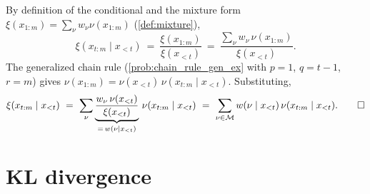 \documentclass[fontsize=11pt, parskip=half]{scrartcl}
\newcommand{\Mc}{\mathcal{M}}
\begin{document}
\begin{solution}
By definition of the conditional and the mixture form $\xi(x_{1:m}) = \sum_\nu w_\nu \nu(x_{1:m})$ (\cref{def:mixture}),
\[
  \xi(x_{t:m} \mid x_{<t})
  ~=~ \frac{\xi(x_{1:m})}{\xi(x_{<t})}
  ~=~ \frac{\sum_\nu w_\nu\, \nu(x_{1:m})}{\xi(x_{<t})}.
\]
The generalized chain rule (\cref{prob:chain_rule_gen_ex} with $p=1$, $q=t-1$, $r=m$) gives $\nu(x_{1:m}) = \nu(x_{<t})\,\nu(x_{t:m} \mid x_{<t})$. Substituting,
\[
  \xi(x_{t:m} \mid x_{<t})
  ~=~ \sum_\nu \underbrace{\frac{w_\nu\, \nu(x_{<t})}{\xi(x_{<t})}}_{=\, w(\nu \mid x_{<t})}\, \nu(x_{t:m} \mid x_{<t})
  ~=~ \sum_{\nu \in \Mc} w(\nu \mid x_{<t})\, \nu(x_{t:m} \mid x_{<t}). \qedhere
\]
\end{solution}

\section{KL divergence}\label{prob:chain_rule}

%
%
\end{document}
